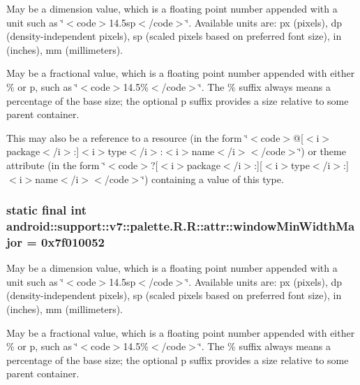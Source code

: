 May be a dimension value, which is a floating point number appended with a unit such as \char`\"{}$<$code$>$14.5sp$<$/code$>$\char`\"{}. Available units are: px (pixels), dp (density-independent pixels), sp (scaled pixels based on preferred font size), in (inches), mm (millimeters). 

May be a fractional value, which is a floating point number appended with either \% or p, such as \char`\"{}$<$code$>$14.5\%$<$/code$>$\char`\"{}. The \% suffix always means a percentage of the base size; the optional p suffix provides a size relative to some parent container. 

This may also be a reference to a resource (in the form \char`\"{}$<$code$>$@\mbox{[}$<$i$>$package$<$/i$>$:\mbox{]}$<$i$>$type$<$/i$>$:$<$i$>$name$<$/i$>$$<$/code$>$\char`\"{}) or theme attribute (in the form \char`\"{}$<$code$>$?\mbox{[}$<$i$>$package$<$/i$>$:\mbox{]}\mbox{[}$<$i$>$type$<$/i$>$:\mbox{]}$<$i$>$name$<$/i$>$$<$/code$>$\char`\"{}) containing a value of this type. \hypertarget{classandroid_1_1support_1_1v7_1_1palette_1_1_r_1_1attr_5dc85c24be2bb456de50087876647a9a}{
\subsubsection[{windowMinWidthMajor}]{\setlength{\rightskip}{0pt plus 5cm}static final int android::support::v7::palette.R.R::attr::windowMinWidthMajor = 0x7f010052}}
\label{classandroid_1_1support_1_1v7_1_1palette_1_1_r_1_1attr_5dc85c24be2bb456de50087876647a9a}


May be a dimension value, which is a floating point number appended with a unit such as \char`\"{}$<$code$>$14.5sp$<$/code$>$\char`\"{}. Available units are: px (pixels), dp (density-independent pixels), sp (scaled pixels based on preferred font size), in (inches), mm (millimeters). 

May be a fractional value, which is a floating point number appended with either \% or p, such as \char`\"{}$<$code$>$14.5\%$<$/code$>$\char`\"{}. The \% suffix always means a percentage of the base size; the optional p suffix provides a size relative to some parent container. 

